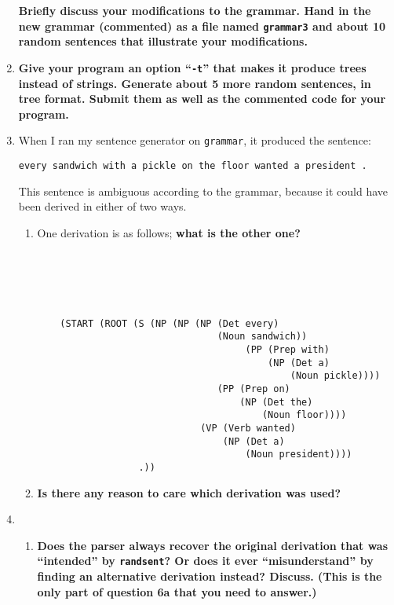 \documentclass[10pt]{article}
\begin{document}
\begin{enumerate}
\noindent
{\bf Briefly discuss your modifications to the grammar. Hand
  in the new grammar (commented) as a file named \verb|grammar3| and about 10
  random sentences that illustrate your modifications.}

\item {\bf Give your program an option ``\verb|-t|'' that makes it produce
  trees instead of strings. Generate about 5 more random
sentences, in tree format. Submit them as well as the commented code
for your program.} 

\item When I ran my sentence generator on \verb|grammar|, it produced
  the sentence:
\begin{verbatim}
every sandwich with a pickle on the floor wanted a president .
\end{verbatim}
\noindent
This sentence is ambiguous according to the grammar, because it could
have been derived in either of two ways.
\begin{enumerate}
\item  One derivation is as follows; {\bf what is the other one?}

\bigskip
\begin{verbatim}





    (START (ROOT (S (NP (NP (NP (Det every)
                                (Noun sandwich))
                                     (PP (Prep with)
                                         (NP (Det a)
                                             (Noun pickle))))
                                (PP (Prep on)
                                    (NP (Det the)
                                        (Noun floor))))
                             (VP (Verb wanted)
                                 (NP (Det a)
                                     (Noun president))))
                  .))
\end{verbatim}
\item {\bf Is there any reason to care which derivation was used?}
\end{enumerate}

\item\begin{enumerate}
 \item {\bf Does the parser
  always recover the original derivation that was ``intended'' by
  \verb|randsent|? Or does it ever ``misunderstand'' by finding an alternative
  derivation instead?  Discuss. (This is the only part of question 6a
  that you need to answer.)}


\end{enumerate}
\end{enumerate}
\end{document}
